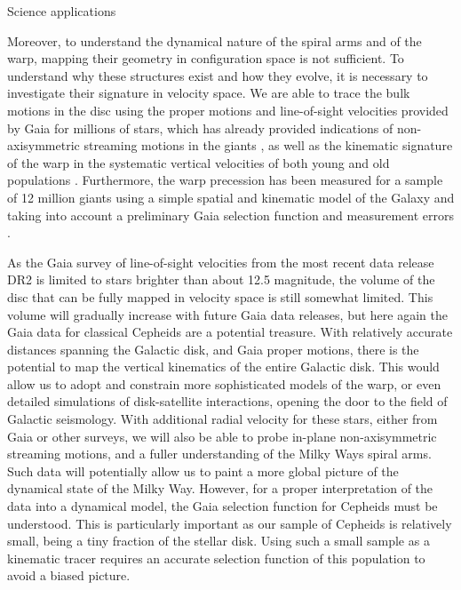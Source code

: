\begin{workpackage}{Science applications}
\begin{wpobjectives}
\begin{description}
{        Moreover, to understand the dynamical nature of the spiral arms and of the warp, mapping their geometry in configuration space is not sufficient. To understand why these structures exist and how they evolve, it is necessary to investigate their signature in velocity space. We are able to trace the bulk motions in the disc using the proper motions and line-of-sight velocities provided by Gaia for millions of stars, which has already provided indications of non-axisymmetric streaming motions in the giants \citep[see Fig.\ 5 in][]{Katz2018a}, as well as the kinematic signature of the warp in the systematic vertical velocities of both young and old populations \cite{Poggio2018}. Furthermore, the warp precession has been measured for a sample of 12 million giants using a simple spatial and kinematic model of the Galaxy and taking into account a preliminary Gaia selection function and measurement errors \cite{Poggio2020}. 
        
        As the Gaia survey of line-of-sight velocities from the most recent data release DR2 is limited to stars brighter than about 12.5 magnitude, the volume of the disc that can be fully mapped in velocity space is still somewhat limited. This volume will gradually increase with future Gaia data releases, but here again the Gaia data for classical Cepheids are a potential treasure. With relatively accurate distances spanning the Galactic disk, and Gaia proper motions, there is the potential to map the vertical kinematics of the entire Galactic disk. This would allow us to adopt and constrain more sophisticated models of the warp, or even detailed simulations of disk-satellite interactions, opening the door to the field of Galactic seismology. With additional radial velocity for these stars, either from Gaia or other surveys, we will also be able to probe in-plane non-axisymmetric streaming motions, and a fuller understanding of the Milky Ways spiral arms. Such data will potentially allow us to paint a more global picture of the dynamical state of the Milky Way. However, for a proper interpretation of the data into a dynamical model, the Gaia selection function for Cepheids must be understood. This is particularly important as our sample of Cepheids is relatively small, being a tiny fraction of the stellar disk. Using such a small sample as a kinematic tracer requires an accurate selection function of this population to avoid a biased picture. 
     
}
\end{description}
\end{wpobjectives}
\end{workpackage}
